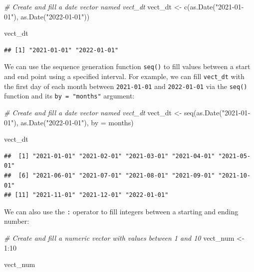 \documentclass[
]{book}
\newenvironment{Shaded}{\begin{snugshade}}{\end{snugshade}}
\newcommand{\AttributeTok}[1]{\textcolor[rgb]{0.77,0.63,0.00}{#1}}
\newcommand{\CommentTok}[1]{\textcolor[rgb]{0.56,0.35,0.01}{\textit{#1}}}
\newcommand{\DecValTok}[1]{\textcolor[rgb]{0.00,0.00,0.81}{#1}}
\newcommand{\FunctionTok}[1]{\textcolor[rgb]{0.00,0.00,0.00}{#1}}
\newcommand{\NormalTok}[1]{#1}
\newcommand{\OtherTok}[1]{\textcolor[rgb]{0.56,0.35,0.01}{#1}}
\newcommand{\SpecialCharTok}[1]{\textcolor[rgb]{0.00,0.00,0.00}{#1}}
\newcommand{\StringTok}[1]{\textcolor[rgb]{0.31,0.60,0.02}{#1}}
\begin{document}
\begin{Shaded}
\begin{Highlighting}[]
\CommentTok{\# Create and fill a date vector named vect\_dt}
\NormalTok{vect\_dt }\OtherTok{\textless{}{-}} \FunctionTok{c}\NormalTok{(}\FunctionTok{as.Date}\NormalTok{(}\StringTok{"2021{-}01{-}01"}\NormalTok{), }\FunctionTok{as.Date}\NormalTok{(}\StringTok{"2022{-}01{-}01"}\NormalTok{))}

\NormalTok{vect\_dt}
\end{Highlighting}
\end{Shaded}

\begin{verbatim}
## [1] "2021-01-01" "2022-01-01"
\end{verbatim}

We can use the sequence generation function \texttt{seq()} to fill values between a start and end point using a specified interval. For example, we can fill \texttt{vect\_dt} with the first day of each month between \texttt{2021-01-01} and \texttt{2022-01-01} via the \texttt{seq()} function and its \texttt{by\ =\ "months"} argument:

\begin{Shaded}
\begin{Highlighting}[]
\CommentTok{\# Create and fill a date vector named vect\_dt}
\NormalTok{vect\_dt }\OtherTok{\textless{}{-}} \FunctionTok{seq}\NormalTok{(}\FunctionTok{as.Date}\NormalTok{(}\StringTok{"2021{-}01{-}01"}\NormalTok{), }\FunctionTok{as.Date}\NormalTok{(}\StringTok{"2022{-}01{-}01"}\NormalTok{), }\AttributeTok{by =} \StringTok{\textquotesingle{}months\textquotesingle{}}\NormalTok{)}

\NormalTok{vect\_dt}
\end{Highlighting}
\end{Shaded}

\begin{verbatim}
##  [1] "2021-01-01" "2021-02-01" "2021-03-01" "2021-04-01" "2021-05-01"
##  [6] "2021-06-01" "2021-07-01" "2021-08-01" "2021-09-01" "2021-10-01"
## [11] "2021-11-01" "2021-12-01" "2022-01-01"
\end{verbatim}

We can also use the \texttt{:} operator to fill integers between a starting and ending number:

\begin{Shaded}
\begin{Highlighting}[]
\CommentTok{\# Create and fill a numeric vector with values between 1 and 10}
\NormalTok{vect\_num }\OtherTok{\textless{}{-}} \DecValTok{1}\SpecialCharTok{:}\DecValTok{10}

\NormalTok{vect\_num}
\end{Highlighting}
\end{Shaded}
\end{document}
